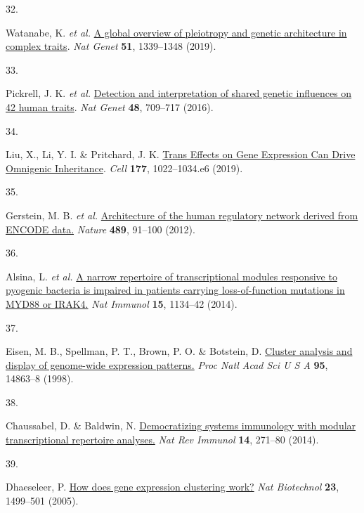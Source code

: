 \documentclass[
  a4paper,
]{article}
\newlength{\cslhangindent}
\newlength{\csllabelwidth}
\newlength{\cslentryspacingunit} %
\newenvironment{CSLReferences}[2] %
 {%
  \setlength{\parindent}{0pt}
  \ifodd #1
  \let\oldpar\par
  \def\par{\hangindent=\cslhangindent\oldpar}
  \fi
  \setlength{\parskip}{#2\cslentryspacingunit}
 }%
 {}
\newcommand{\CSLLeftMargin}[1]{\parbox[t]{\csllabelwidth}{#1}}
\newcommand{\CSLRightInline}[1]{\parbox[t]{\linewidth - \csllabelwidth}{#1}\break}
\begin{document}
\begin{CSLReferences}{0}{0}
\leavevmode{}%
\CSLLeftMargin{32. }%
\CSLRightInline{Watanabe, K. \emph{et al.} \href{https://doi.org/10.1038/s41588-019-0481-0}{A global overview of pleiotropy and genetic architecture in complex traits}. \emph{Nat Genet} \textbf{51}, 1339--1348 (2019).}

\leavevmode{}%
\CSLLeftMargin{33. }%
\CSLRightInline{Pickrell, J. K. \emph{et al.} \href{https://doi.org/10.1038/ng.3570}{Detection and interpretation of shared genetic influences on 42 human traits}. \emph{Nat Genet} \textbf{48}, 709--717 (2016).}

\leavevmode{}%
\CSLLeftMargin{34. }%
\CSLRightInline{Liu, X., Li, Y. I. \& Pritchard, J. K. \href{https://doi.org/10.1016/j.cell.2019.04.014}{Trans Effects on Gene Expression Can Drive Omnigenic Inheritance}. \emph{Cell} \textbf{177}, 1022--1034.e6 (2019).}

\leavevmode{}%
\CSLLeftMargin{35. }%
\CSLRightInline{Gerstein, M. B. \emph{et al.} \href{https://doi.org/10.1038/nature11245}{Architecture of the human regulatory network derived from ENCODE data.} \emph{Nature} \textbf{489}, 91--100 (2012).}

\leavevmode{}%
\CSLLeftMargin{36. }%
\CSLRightInline{Alsina, L. \emph{et al.} \href{https://doi.org/10.1038/ni.3028}{A narrow repertoire of transcriptional modules responsive to pyogenic bacteria is impaired in patients carrying loss-of-function mutations in MYD88 or IRAK4.} \emph{Nat Immunol} \textbf{15}, 1134--42 (2014).}

\leavevmode{}%
\CSLLeftMargin{37. }%
\CSLRightInline{Eisen, M. B., Spellman, P. T., Brown, P. O. \& Botstein, D. \href{https://doi.org/10.1073/pnas.95.25.14863}{Cluster analysis and display of genome-wide expression patterns.} \emph{Proc Natl Acad Sci U S A} \textbf{95}, 14863--8 (1998).}

\leavevmode{}%
\CSLLeftMargin{38. }%
\CSLRightInline{Chaussabel, D. \& Baldwin, N. \href{https://doi.org/10.1038/nri3642}{Democratizing systems immunology with modular transcriptional repertoire analyses.} \emph{Nat Rev Immunol} \textbf{14}, 271--80 (2014).}

\leavevmode{}%
\CSLLeftMargin{39. }%
\CSLRightInline{D\textquotesingle haeseleer, P. \href{https://doi.org/10.1038/nbt1205-1499}{How does gene expression clustering work?} \emph{Nat Biotechnol} \textbf{23}, 1499--501 (2005).}


\end{CSLReferences}
\end{document}
